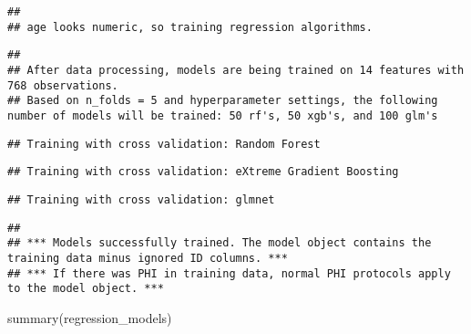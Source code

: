 \documentclass[
]{article}
\newenvironment{Shaded}{\begin{snugshade}}{\end{snugshade}}
\newcommand{\FunctionTok}[1]{\textcolor[rgb]{0.00,0.00,0.00}{#1}}
\newcommand{\NormalTok}[1]{#1}
\begin{document}
\begin{verbatim}
## 
## age looks numeric, so training regression algorithms.
\end{verbatim}

\begin{verbatim}
## 
## After data processing, models are being trained on 14 features with 768 observations.
## Based on n_folds = 5 and hyperparameter settings, the following number of models will be trained: 50 rf's, 50 xgb's, and 100 glm's
\end{verbatim}

\begin{verbatim}
## Training with cross validation: Random Forest
\end{verbatim}

\begin{verbatim}
## Training with cross validation: eXtreme Gradient Boosting
\end{verbatim}

\begin{verbatim}
## Training with cross validation: glmnet
\end{verbatim}

\begin{verbatim}
## 
## *** Models successfully trained. The model object contains the training data minus ignored ID columns. ***
## *** If there was PHI in training data, normal PHI protocols apply to the model object. ***
\end{verbatim}

\begin{Shaded}
\begin{Highlighting}[]
\FunctionTok{summary}\NormalTok{(regression\_models)}
\end{Highlighting}
\end{Shaded}
\end{document}
